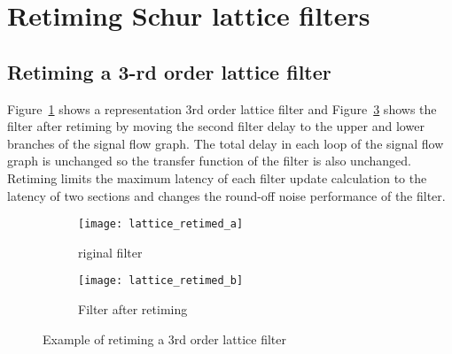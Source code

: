 \documentclass[a4paper,twoside,10pt,english]{report}
\begin{document}
\section{\label{sec:Retiming-Schur-lattice-filters}Retiming Schur lattice filters}
\subsection{\label{sec:Retiming-3rd-order-lattice-filter}Retiming a
3-rd order lattice filter}
Figure~\ref{subfig:example-lattice-filter} shows a representation $3$rd order
lattice filter and Figure~\ref{subfig:example-lattice-filter-after-retiming}
shows the filter after retiming by moving the second filter delay to the upper
and lower branches of the signal flow graph. The total delay in each loop of
the signal flow graph is unchanged so the transfer function of the filter is
also unchanged. Retiming limits the maximum latency of each filter update
calculation to the latency of two sections and changes the round-off noise
performance of the filter.
\begin{figure}
\begin{subfigure}{\textwidth}
\begin{center}
\texttt{[image: lattice\_retimed\_a]}
\caption{riginal filter}
\label{subfig:example-lattice-filter}
\vspace{1cm}
\end{center}
\end{subfigure}
\begin{subfigure}{\textwidth}
\begin{center}
\texttt{[image: lattice\_retimed\_b]}
\caption{Filter after retiming}
\label{subfig:example-lattice-filter-after-retiming}
\end{center}
\end{subfigure}
\caption{Example of retiming a 3rd order lattice filter}
\end{figure}
\end{document}
